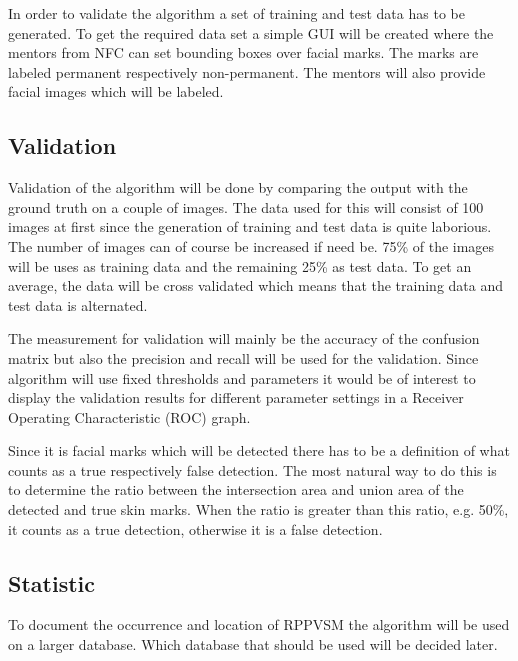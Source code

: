 In order to validate the algorithm a set of training and test data has to be generated. To get the required data set a simple GUI will be created where the mentors from NFC can set bounding boxes over facial marks. The marks are labeled permanent respectively non-permanent. The mentors will also provide facial images which will be labeled.      

\subsection{Validation}

Validation of the algorithm will be done by comparing the output with the ground truth on a couple of images. The data used for this will consist of 100 images at first since the generation of training and test data is quite laborious. The number of images can of course be increased if need be. 75\% of the images will be uses as training data and the remaining 25\% as test data. To get an average, the data will be cross validated which means that the training data and test data is alternated. 

The measurement for validation will mainly be the accuracy of the confusion matrix but also the precision and recall will be used for the validation. Since algorithm will use fixed thresholds and parameters it would be of interest to display the validation results for different parameter settings in a Receiver Operating Characteristic (ROC) graph.

Since it is facial marks which will be detected there has to be a definition of what counts as a true respectively false detection. The most natural way to do this is to determine the ratio between the intersection area and union area of the detected and true skin marks. When the ratio is greater than this ratio, e.g. 50\%, it counts as a true detection, otherwise it is a false detection. 


\subsection{Statistic}

To document the occurrence and location of RPPVSM the algorithm will be used on a larger database. Which database that should be used will be decided later.     
